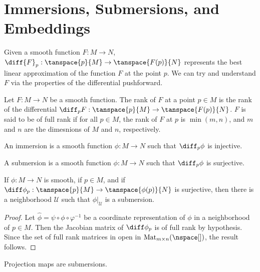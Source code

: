\section{Immersions, Submersions, and Embeddings}
        Given a smooth function $F:M\rightarrow{N}$,
        $\diff{F}_{p}:\tanspace{p}{M}\rightarrow\tanspace{F(p)}{N}$ represents
        the best linear approximation of the function $F$ at the point $p$. We
        can try and understand $F$ via the properties of the differential
        pushforward.
        \begin{definition}
            Let $F:M\rightarrow{N}$ be a smooth function. The rank of $F$ at a
            point $p\in{M}$ is the rank of the differential
            $\diff_{p}F:\tanspace{p}{M}\rightarrow\tanspace{F(p)}{N}$. $F$ is
            said to be of full rank if for all $p\in{M}$, the rank of $F$ at $p$
            is $\min(m,n)$, and $m$ and $n$ are the dimesnions of $M$ and
            $n$, respectively.
        \end{definition}
        \begin{definition}
            An immersion is a smooth function $\phi:M\rightarrow{N}$ such that
            $\diff_{p}\phi$ is injective.
        \end{definition}
        \begin{definition}
            A submersion is a smooth function $\phi:M\rightarrow{N}$ such that
            $\diff_{p}\phi$ is surjective.
        \end{definition}
        \begin{theorem}
            If $\phi:M\rightarrow{N}$ is smooth, if $p\in{M}$, and if
            $\diff\phi_{p}:\tanspace{p}{M}\rightarrow\tanspace{\phi(p)}{N}$ is
            surjective, then there is a neighborhood $\mathcal{U}$ such that
            $\phi|_{\mathcal{U}}$ is a submersion.
        \end{theorem}
        \begin{proof}
            Let $\hat{\phi}=\psi\circ\phi\circ\varphi^{\minus{1}}$ be a
            coordinate representation of $\phi$ in a neighborhood of $p\in{M}$.
            Then the Jacobian matrix of $\diff\phi_{p}$ is of full rank by
            hypothesis. Since the set of full rank matrices in open in
            $\textrm{Mat}_{m\times{n}}(\nspace[])$, the result follows.
        \end{proof}
        \begin{example}
            Projection maps are submersions.
        \end{example}

